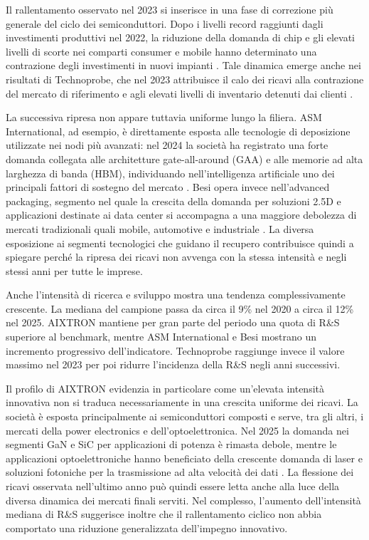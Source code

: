 \documentclass[11pt,a4paper]{article}
\begin{document}
Il rallentamento osservato nel 2023 si inserisce in una fase di correzione più generale del ciclo dei semiconduttori. Dopo i livelli record raggiunti dagli investimenti produttivi nel 2022, la riduzione della domanda di chip e gli elevati livelli di scorte nei comparti consumer e mobile hanno determinato una contrazione degli investimenti in nuovi impianti \citep{semi2023}. Tale dinamica emerge anche nei risultati di Technoprobe, che nel 2023 attribuisce il calo dei ricavi alla contrazione del mercato di riferimento e agli elevati livelli di inventario detenuti dai clienti \citep{technoprobe2023h1}.

La successiva ripresa non appare tuttavia uniforme lungo la filiera. ASM International, ad esempio, è direttamente esposta alle tecnologie di deposizione utilizzate nei nodi più avanzati: nel 2024 la società ha registrato una forte domanda collegata alle architetture gate-all-around (GAA) e alle memorie ad alta larghezza di banda (HBM), individuando nell'intelligenza artificiale uno dei principali fattori di sostegno del mercato \citep{asm2024q3}. Besi opera invece nell'advanced packaging, segmento nel quale la crescita della domanda per soluzioni 2.5D e applicazioni destinate ai data center si accompagna a una maggiore debolezza di mercati tradizionali quali mobile, automotive e industriale \citep{besi2026}. La diversa esposizione ai segmenti tecnologici che guidano il recupero contribuisce quindi a spiegare perché la ripresa dei ricavi non avvenga con la stessa intensità e negli stessi anni per tutte le imprese.

Anche l'intensità di ricerca e sviluppo mostra una tendenza complessivamente crescente. La mediana del campione passa da circa il 9\% nel 2020 a circa il 12\% nel 2025. AIXTRON mantiene per gran parte del periodo una quota di R\&S superiore al benchmark, mentre ASM International e Besi mostrano un incremento progressivo dell'indicatore. Technoprobe raggiunge invece il valore massimo nel 2023 per poi ridurre l'incidenza della R\&S negli anni successivi.

Il profilo di AIXTRON evidenzia in particolare come un'elevata intensità innovativa non si traduca necessariamente in una crescita uniforme dei ricavi. La società è esposta principalmente ai semiconduttori composti e serve, tra gli altri, i mercati della power electronics e dell'optoelettronica. Nel 2025 la domanda nei segmenti GaN e SiC per applicazioni di potenza è rimasta debole, mentre le applicazioni optoelettroniche hanno beneficiato della crescente domanda di laser e soluzioni fotoniche per la trasmissione ad alta velocità dei dati \citep{aixtron2026}. La flessione dei ricavi osservata nell'ultimo anno può quindi essere letta anche alla luce della diversa dinamica dei mercati finali serviti. Nel complesso, l'aumento dell'intensità mediana di R\&S suggerisce inoltre che il rallentamento ciclico non abbia comportato una riduzione generalizzata dell'impegno innovativo.
\end{document}
